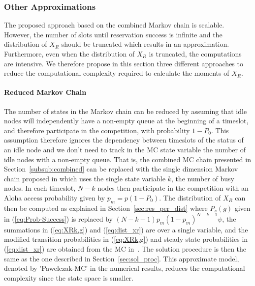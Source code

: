 \documentclass[12pt,journal,oneside,onecolumn]{IEEEtran}
\begin{document}
\subsubsection{Other Approximations}
\label{sec:xr_approx}

The proposed approach based on the combined Markov chain is scalable. 
However, the number of slots until 
reservation success is infinite and the distribution of $X_R$ should be truncated
which results in an approximation. Furthermore, even when the distribution of $X_R$ is truncated,
the computations are intensive. We therefore propose in this section three different approaches
to reduce the computational complexity required to calculate the moments of $X_R$.


\paragraph{Reduced Markov Chain}
The number of states in the Markov chain can be reduced by assuming
that idle nodes will independently have a non-empty queue at the beginning of
a timeslot, and therefore participate in the competition, with probability $1-P_0$.
This assumption therefore ignores the dependency between timeslots of the
status of an idle node and we don't need to track in the MC state variable
the number of idle nodes with a non-empty queue. That is, the combined MC chain presented
in Section~\ref{subsub:combined} can be replaced with the single dimension 
Markov chain proposed in \cite{pawelczak09} which uses the single state variable $k$, the number
of busy nodes. 
In each timeslot, $N-k$ nodes then participate in the competition with an
Aloha access probability given by $p_m=p (1-P_0)$. 
The distribution of $X_R$ can then be computed as explained in Section~\ref{sec:res_per_dist}  where
$P_s(g)$ given in (\ref{eq:Prob-Success}) is replaced by $(N-k-1) p_m (1-p_m)^{N-k-1} \psi$,
the summations in (\ref{eq:XRk,g}) and (\ref{eq:dist_xr}) are over a single variable, and the modified transition probabilities in (\ref{eq:XRk,g}) and
steady state probabilities in (\ref{eq:dist_xr}) are obtained from the MC in~\cite{pawelczak09}.  
The solution procedure is then the same as the one described in Section~\ref{sec:sol_proc}.
This approximate model, denoted by 'Pawelczak-MC' in the numerical results, reduces the computational complexity since the state space is smaller.
\end{document}
